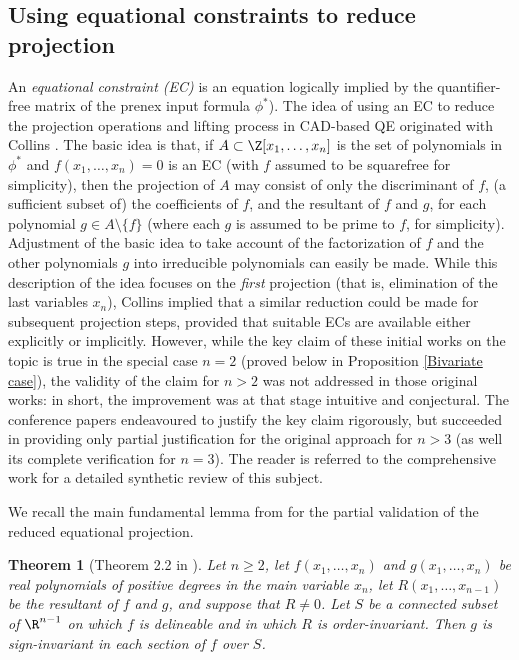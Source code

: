 \documentclass{article}
\newtheorem{theorem}{Theorem}
\begin{document}
\subsection{Using equational constraints to reduce projection}
An {\em equational constraint (EC)} is an equation logically implied by the quantifier-free matrix of the prenex input formula $\phi^*$).  The idea of using an EC to reduce the projection operations and lifting process 
in CAD-based QE originated with Collins \cite{Collins1996, Collins1998}.
The basic idea is that, if $A \subset \Z[x_1, \ldots, x_n]$ is the set of
polynomials in $\phi^*$ and $f(x_1, \ldots, x_n) = 0$ is an EC (with $f$
assumed to be squarefree for simplicity), then the projection of $A$
may consist of only the discriminant of $f$, (a sufficient subset of) the coefficients of $f$,
and the resultant of $f$ and $g$, for each polynomial $g \in A \setminus \{f\}$ (where each $g$ is assumed to be prime to $f$, for simplicity).
Adjustment of the basic idea to take account of the factorization of
$f$ and the other polynomials $g$ into irreducible polynomials can 
easily be made. While this description of the idea focuses on the {\em first} projection (that is, elimination of the last variables $x_n$),
Collins implied that a similar reduction could be made for
subsequent projection steps, provided that suitable ECs are available
either explicitly or implicitly.
However, while the key claim of these initial works on the topic is
true in the special case $n = 2$ (proved below in
Proposition \ref{Bivariate case}), the validity of the claim
for $n > 2$ was not addressed in those original works: in short, the improvement was at 
that stage intuitive and conjectural.
The conference papers \cite{McCallum1999, McCallum2001} endeavoured to
justify the key claim rigorously, but succeeded in
providing only partial justification for the original approach
for $n > 3$ (as well its complete verification for $n = 3$).
The reader is referred to the comprehensive work \cite{EBD2020}
for a detailed synthetic review of this subject.

We recall the main fundamental lemma from \cite{McCallum1999} for the partial validation of the reduced equational projection.

\begin{theorem}[Theorem 2.2 in \cite{McCallum1999}] \label{Main lemma for reduced equational projection}
Let $n \ge 2$, let $f(x_1, \ldots, x_n)$ and $g(x_1, \ldots, x_n)$
be real polynomials of positive degrees in the main variable $x_n$,
let $R(x_1, \ldots, x_{n-1})$ be the resultant of $f$ and $g$, and suppose
that $R \neq 0$. Let $S$ be a connected subset of $\R^{n-1}$ on
which $f$ is delineable and in which $R$ is order-invariant.
Then $g$ is sign-invariant in each section of $f$ over $S$.
\end{theorem}
\end{document}
